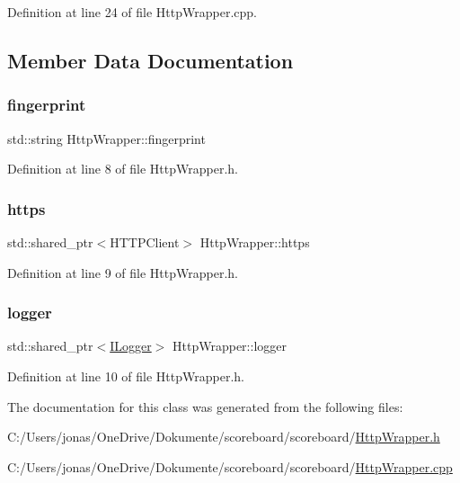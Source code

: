 Definition at line 24 of file Http\+Wrapper.\+cpp.



\subsection{Member Data Documentation}
\mbox{\label{class_http_wrapper_ad79bd50b7d1e7de1de0677eecbf2a8d3}} 
\subsubsection{\texorpdfstring{fingerprint}{fingerprint}}
{\footnotesize\ttfamily std\+::string Http\+Wrapper\+::fingerprint\hspace{0.3cm}{\ttfamily [private]}}



Definition at line 8 of file Http\+Wrapper.\+h.

\mbox{\label{class_http_wrapper_a166384df03a99c77da6051fcf6f25f29}} 
\subsubsection{\texorpdfstring{https}{https}}
{\footnotesize\ttfamily std\+::shared\+\_\+ptr$<$H\+T\+T\+P\+Client$>$ Http\+Wrapper\+::https\hspace{0.3cm}{\ttfamily [private]}}



Definition at line 9 of file Http\+Wrapper.\+h.

\mbox{\label{class_http_wrapper_aecd53efb752913b0a9beb14491ce8baa}} 
\subsubsection{\texorpdfstring{logger}{logger}}
{\footnotesize\ttfamily std\+::shared\+\_\+ptr$<$\hyperlink{class_i_logger}{I\+Logger}$>$ Http\+Wrapper\+::logger\hspace{0.3cm}{\ttfamily [private]}}



Definition at line 10 of file Http\+Wrapper.\+h.



The documentation for this class was generated from the following files\+:\begin{DoxyCompactItemize}
\item 
C\+:/\+Users/jonas/\+One\+Drive/\+Dokumente/scoreboard/scoreboard/\hyperlink{_http_wrapper_8h}{Http\+Wrapper.\+h}\item 
C\+:/\+Users/jonas/\+One\+Drive/\+Dokumente/scoreboard/scoreboard/\hyperlink{_http_wrapper_8cpp}{Http\+Wrapper.\+cpp}\end{DoxyCompactItemize}
